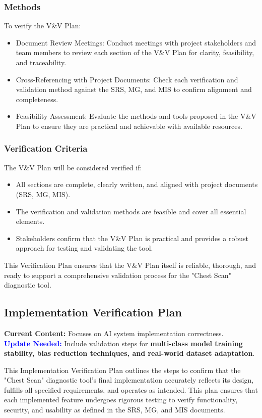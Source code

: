 \documentclass[12pt, titlepage]{article}
\begin{document}
\subsubsection{Methods}
To verify the V\&V Plan:
\begin{itemize}
  \item Document Review Meetings: Conduct meetings with project stakeholders and team members to review each section of the V\&V Plan for clarity, feasibility, and traceability.
  \item Cross-Referencing with Project Documents: Check each verification and validation method against the SRS, MG, and MIS to confirm alignment and completeness.
  \item Feasibility Assessment: Evaluate the methods and tools proposed in the V\&V Plan to ensure they are practical and achievable with available resources.
\end{itemize}

\subsubsection{Verification Criteria}
The V\&V Plan will be considered verified if:
\begin{itemize}
  \item All sections are complete, clearly written, and aligned with project documents (SRS, MG, MIS).
  \item The verification and validation methods are feasible and cover all essential elements.
  \item Stakeholders confirm that the V\&V Plan is practical and provides a robust approach for testing and validating the tool.
\end{itemize}
This Verification Plan ensures that the V\&V Plan itself is reliable, thorough, and ready to support a comprehensive validation process for the "Chest Scan" diagnostic tool.

\subsection{Implementation Verification Plan}

\textbf{Current Content:} Focuses on AI system implementation correctness. \\
\textbf{\textcolor{blue}{Update Needed:}} Include validation steps for \textbf{multi-class model training stability, bias reduction techniques, and real-world dataset adaptation}.

This Implementation Verification Plan outlines the steps to confirm that the "Chest Scan" diagnostic tool’s final implementation accurately reflects its design, fulfills all specified requirements, and operates as intended. This plan ensures that each implemented feature undergoes rigorous testing to verify functionality, security, and usability as defined in the SRS, MG, and MIS documents.
\end{document}
